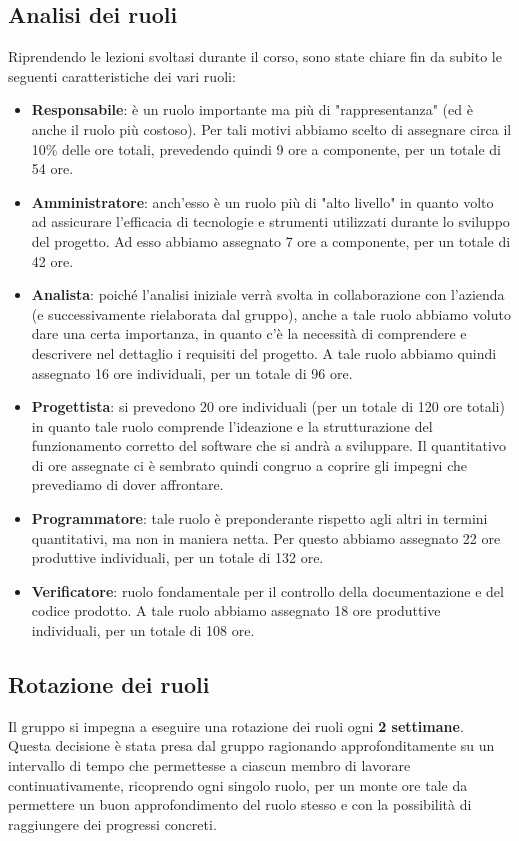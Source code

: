 \subsection{Analisi dei ruoli}
\noindent Riprendendo le lezioni svoltasi durante il corso, sono state chiare fin da subito le seguenti caratteristiche dei vari ruoli:
\begin{itemize}
    \item \textbf{Responsabile}: è un ruolo importante ma più di "rappresentanza" (ed è anche il ruolo più costoso). Per tali motivi abbiamo scelto di assegnare circa il 10\% delle ore totali, prevedendo quindi 9 ore a componente, per un totale di 54 ore.
    \item \textbf{Amministratore}: anch'esso è un ruolo più di "alto livello" in quanto volto ad assicurare l'efficacia di tecnologie e strumenti utilizzati durante lo sviluppo del progetto. Ad esso abbiamo assegnato 7 ore a componente, per un totale di 42 ore.
    \item \textbf{Analista}: poiché l'analisi iniziale verrà svolta in collaborazione con l'azienda (e successivamente rielaborata dal gruppo), anche a tale ruolo abbiamo voluto dare una certa importanza, in quanto c'è la necessità di comprendere e descrivere nel dettaglio i requisiti del progetto. A tale ruolo abbiamo quindi assegnato 16 ore individuali, per un totale di 96 ore.
    \item \textbf{Progettista}: si prevedono 20 ore individuali (per un totale di 120 ore totali) in quanto tale ruolo comprende l'ideazione e la strutturazione del funzionamento corretto del software che si andrà a sviluppare. Il quantitativo di ore assegnate ci è sembrato quindi congruo a coprire gli impegni che prevediamo di dover affrontare.
    \item \textbf{Programmatore}: tale ruolo è preponderante rispetto agli altri in termini quantitativi, ma non in maniera netta. Per questo abbiamo assegnato 22 ore produttive individuali, per un totale di 132 ore.
    \item \textbf{Verificatore}: ruolo fondamentale per il controllo della documentazione e del codice prodotto. A tale ruolo abbiamo assegnato 18 ore produttive individuali, per un totale di 108 ore.
\end{itemize}

\vspace{0.5cm}

\subsection{Rotazione dei ruoli}
Il gruppo si impegna a eseguire una rotazione dei ruoli ogni \textbf{2 settimane}. \\ Questa decisione è stata presa dal gruppo ragionando approfonditamente su un intervallo di tempo che permettesse a ciascun membro di lavorare continuativamente, ricoprendo ogni singolo ruolo, per un monte ore tale da permettere un buon approfondimento del ruolo stesso e con la possibilità di raggiungere dei progressi concreti.\\\\

